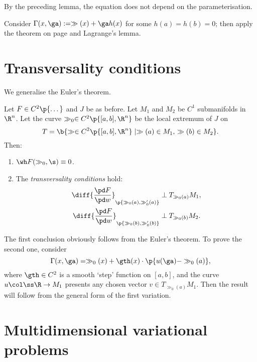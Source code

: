 \begin{remark}
  By the preceding lemma, the equation does not depend on the parameterisation.  
\end{remark}

\begin{idea}
  Consider $\Gamma(x, \ga) := \gg(x) + \ga h(x)$ for some $h(a) = h(b) = 0$; then apply the theorem on page \pageref{general form of the first variation} and Lagrange's lemma.
\end{idea}

\section{Transversality conditions}

We generalise the Euler's theorem.

\begin{theorem}
  Let $F \in C^2 \p{\dots}$ and $J$ be as before.
  Let $M_1$ and $M_2$ be $C^1$ submanifolds in $\R^n$.
  Let the curve $\gg_0 \in C^2 \p{ [a, b], \R^n}$ be the local extremum of $J$ on
  $$ T = \b{\gg \in C^2\p{[a, b], \R^n} \mid \gg(a) \in M_1,\, \gg(b) \in M_2 }. $$
  Then:
  \begin{enumerate}
    \item $\wh F(\gg_0, \s) \equiv 0$.
    \item The \emph{transversality conditions} hold:
    \begin{align*}
      \diff{\frac{\pd F}{\pd w}}_{\p{\gg_0(a), \gg_0'(a)}} &\perp T_{\gg_0(a)} M_1, \\
      \diff{\frac{\pd F}{\pd w}}_{\p{\gg_0(b), \gg_0'(b)}} &\perp T_{\gg_0(b)} M_2.
    \end{align*}
  \end{enumerate}
\end{theorem}

\begin{idea}
  The first conclusion obviously follows from the Euler's theorem.
  To prove the second one, consider
  $$ \Gamma(x, \ga) = \gg_0(x) + \gth(x) \cdot \p{u(\ga)- \gg_0(a)}, $$
  where $\gth \in C^2$ is a smooth `step' function on $[a, b]$, and the curve $u \col \ss \R \to M_1$ presents any chosen vector $v \in T_{\gg_0(a)}M_1$.
  Then the result will follow from the general form of the first variation.
\end{idea}


\section{Multidimensional variational problems}

